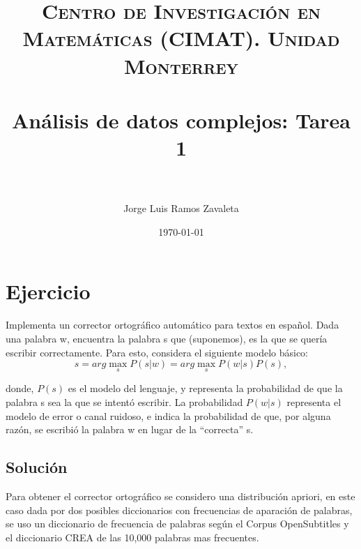 \documentclass[paper=letter, fontsize=11pt]{scrartcl}
\title{	
\normalfont \normalsize 
\textsc{Centro de Investigaci\'on en Matem\'aticas (CIMAT). Unidad Monterrey} 
\\ [25pt] 
\horrule{0.5pt} \\[0.4cm] %
\huge An\'alisis de datos complejos: Tarea 1\\ 
\horrule{2pt} \\[0.5cm] %
}
\author{Jorge Luis Ramos Zavaleta} %
\date{\normalsize\today} %
\numberwithin{equation}{section} %
\numberwithin{figure}{section} %
\numberwithin{table}{section} %
\begin{document}




\maketitle %


\section{Ejercicio}
Implementa un corrector ortográfico automático para textos en español.
Dada una palabra w, encuentra la palabra s que (suponemos), es la que se quer\'ia
escribir correctamente. Para esto, considera el siguiente modelo básico:
$$s = arg \max\limits_{s} P (s|w) = arg \max\limits_{s} P (w|s)P (s),$$

donde, $P(s)$ es el modelo del lenguaje, y representa la probabilidad de que la
palabra s sea la que se intentó escribir. La probabilidad $P(w|s)$ representa el
modelo de error o canal ruidoso, e indica la probabilidad de que, por alguna
razón, se escribió la palabra w en lugar de la “correcta” s.

\subsection{Soluci\'on}
Para obtener el corrector ortogr\'afico se considero una distribuci\'on apriori, en este caso dada por dos posibles diccionarios con frecuencias de aparaci\'on de palabras, se uso un diccionario de frecuencia de palabras según el Corpus OpenSubtitles y el diccionario CREA de las 10,000 palabras mas frecuentes.\newline
\end{document}
